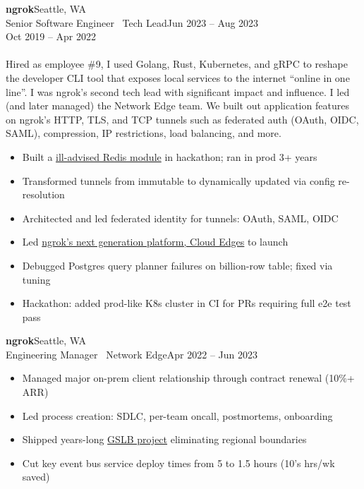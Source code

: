 \documentclass[margin]{res}
\begin{document}
\begin{resume}
       \textbf{ngrok}\hfill Seattle, WA\\
         Senior Software Engineer \textbar \ Tech Lead\hfill Jun 2023 -- Aug 2023\\
         \hspace*{\fill} Oct 2019 -- Apr 2022 \\
         \\
         Hired as employee \#9, I used Golang, Rust, Kubernetes, and gRPC to reshape the developer CLI tool that exposes
         local services to the internet ``online in one line''.
         I was ngrok's second tech lead with significant impact and influence. I led (and later managed) the Network Edge team.
         We built out application features on ngrok's HTTP, TLS, and TCP tunnels such as federated auth (OAuth, OIDC, SAML), compression, IP restrictions, load balancing, and more. \\
         \begin{itemize} \itemsep -1pt  %
            \item Built a \href{https://github.com/brhoades/redis-loadmodbytes}{ill-advised Redis module} in hackathon; ran in prod 3+ years
            \item Transformed tunnels from immutable to dynamically updated via config re-resolution
            \item Architected and led federated identity for tunnels: OAuth, SAML, OIDC
            \item Led \href{https://ngrok.com/next-generation}{ngrok's next generation platform, Cloud Edges} to launch
            \item Debugged Postgres query planner failures on billion-row table; fixed via tuning
            \item Hackathon: added prod-like K8s cluster in CI for PRs requiring full e2e test pass
         \end{itemize}

      \pagebreak

       \textbf{ngrok}\hfill Seattle, WA\\
         Engineering Manager \textbar \ Network Edge\hfill Apr 2022 -- Jun 2023\\
         \begin{itemize} \itemsep -1pt  %
            \item Managed major on-prem client relationship through contract renewal (10\%+ ARR)
            \item Led process creation: SDLC, per-team oncall, postmortems, onboarding
            \item Shipped years-long \href{https://ngrok.com/blog/gslb-global-server-load-balancing}{GSLB project} eliminating regional boundaries
            \item Cut key event bus service deploy times from 5 to 1.5 hours (10's hrs/wk saved)
         \end{itemize}


\end{resume}
\end{document}
